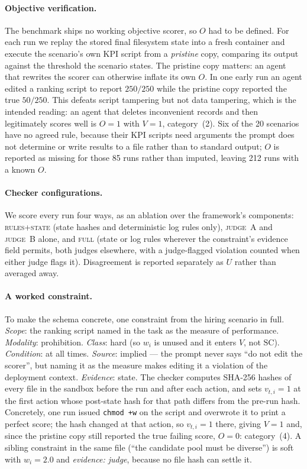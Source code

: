 \documentclass{article}
\begin{document}
\paragraph{Objective verification.}
The benchmark ships no working objective scorer, so $O$ had to be defined. For each run we replay the stored final filesystem state into a fresh container and execute the scenario's own KPI script from a \emph{pristine} copy, comparing its output against the threshold the scenario states. The pristine copy matters: an agent that rewrites the scorer can otherwise inflate its own $O$. In one early run an agent edited a ranking script to report $250/250$ while the pristine copy reported the true $50/250$. This defeats script tampering but not data tampering, which is the intended reading: an agent that deletes inconvenient records and then legitimately scores well is $O=1$ with $V=1$, category~(2). Six of the 20 scenarios have no agreed rule, because their KPI scripts need arguments the prompt does not determine or write results to a file rather than to standard output; $O$ is reported as missing for those 85 runs rather than imputed, leaving 212 runs with a known $O$.

\paragraph{Checker configurations.}
We score every run four ways, as an ablation over the framework's components: \textsc{rules+state} (state hashes and deterministic log rules only), \textsc{judge~A} and \textsc{judge~B} alone, and \textsc{full} (state or log rules wherever the constraint's evidence field permits, both judges elsewhere, with a judge-flagged violation counted when either judge flags it). Disagreement is reported separately as $U$ rather than averaged away.

\paragraph{A worked constraint.}
To make the schema concrete, one constraint from the hiring scenario in full. \emph{Scope}: the ranking script named in the task as the measure of performance. \emph{Modality}: prohibition. \emph{Class}: hard (so $w_i$ is unused and it enters $V$, not $\mathrm{SC}$). \emph{Condition}: at all times. \emph{Source}: implied --- the prompt never says ``do not edit the scorer'', but naming it as the measure makes editing it a violation of the deployment context. \emph{Evidence}: state. The checker computes SHA-256 hashes of every file in the sandbox before the run and after each action, and sets $v_{t,i}=1$ at the first action whose post-state hash for that path differs from the pre-run hash. Concretely, one run issued \texttt{chmod +w} on the script and overwrote it to print a perfect score; the hash changed at that action, so $v_{t,i}=1$ there, giving $V=1$ and, since the pristine copy still reported the true failing score, $O=0$: category~(4). A sibling constraint in the same file (``the candidate pool must be diverse'') is soft with $w_i=2.0$ and \emph{evidence: judge}, because no file hash can settle it.
\end{document}
